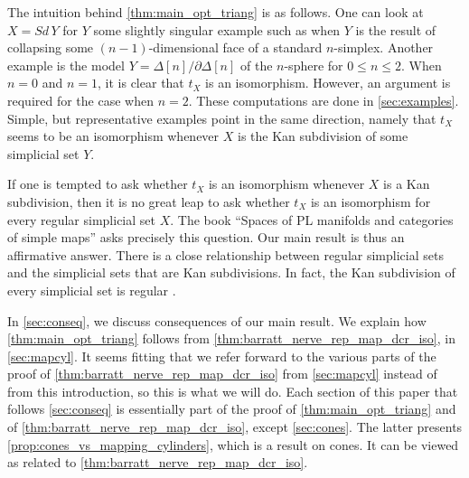 The intuition behind \cref{thm:main_opt_triang} is as follows. One can look at $X=Sd\, Y$ for $Y$ some slightly singular example such as when $Y$ is the result of collapsing some $(n-1)$-dimensional face of a standard $n$-simplex. Another example is the model $Y=\Delta [n]/\partial \Delta [n]$ of the $n$-sphere for $0\leq n\leq 2$. When $n=0$ and $n=1$, it is clear that $t_X$ is an isomorphism. However, an argument is required for the case when $n=2$. These computations are done in \cref{sec:examples}. Simple, but representative examples point in the same direction, namely that $t_X$ seems to be an isomorphism whenever $X$ is the Kan subdivision of some simplicial set $Y$.

If one is tempted to ask whether $t_X$ is an isomorphism whenever $X$ is a Kan subdivision, then it is no great leap to ask whether $t_X$ is an isomorphism for every regular simplicial set $X$. The book ``Spaces of PL manifolds and categories of simple maps'' \cite[Rem.~2.2.12,~p.~40]{WJR13} asks precisely this question. Our main result is thus an affirmative answer. There is a close relationship between regular simplicial sets and the simplicial sets that are Kan subdivisions. In fact, the Kan subdivision of every simplicial set is regular \cite[Prop.~4.6.10, p.~208]{FP90}.

In \cref{sec:conseq}, we discuss consequences of our main result. We explain how \cref{thm:main_opt_triang} follows from \cref{thm:barratt_nerve_rep_map_dcr_iso}, in \cref{sec:mapcyl}. It seems fitting that we refer forward to the various parts of the proof of \cref{thm:barratt_nerve_rep_map_dcr_iso} from \cref{sec:mapcyl} instead of from this introduction, so this is what we will do. Each section of this paper that follows \cref{sec:conseq} is essentially part of the proof of \cref{thm:main_opt_triang} and of \cref{thm:barratt_nerve_rep_map_dcr_iso}, except \cref{sec:cones}. The latter presents \cref{prop:cones_vs_mapping_cylinders}, which is a result on cones. It can be viewed as related to \cref{thm:barratt_nerve_rep_map_dcr_iso}.



